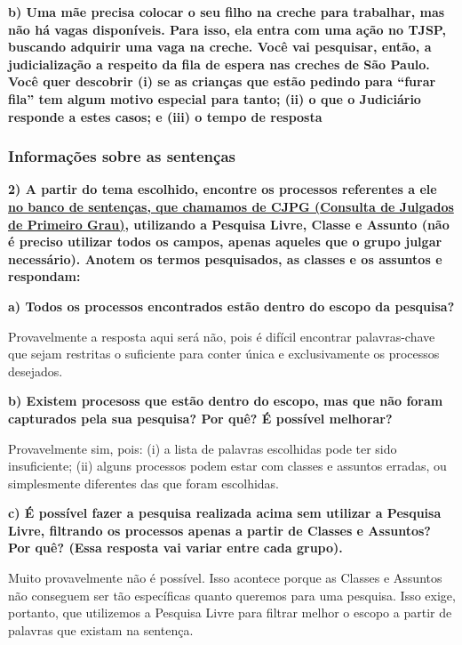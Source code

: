 \documentclass[
  letterpaper,
  DIV=11,
  numbers=noendperiod]{scrartcl}
\begin{document}
\textbf{b) Uma mãe precisa colocar o seu filho na creche para trabalhar,
mas não há vagas disponíveis. Para isso, ela entra com uma ação no TJSP,
buscando adquirir uma vaga na creche. Você vai pesquisar, então, a
judicialização a respeito da fila de espera nas creches de São Paulo.
Você quer descobrir (i) se as crianças que estão pedindo para ``furar
fila'' tem algum motivo especial para tanto; (ii) o que o Judiciário
responde a estes casos; e (iii) o tempo de resposta}

\hypertarget{informauxe7uxf5es-sobre-as-sentenuxe7as}{%
\subsubsection{Informações sobre as
sentenças}\label{informauxe7uxf5es-sobre-as-sentenuxe7as}}

\textbf{2) A partir do tema escolhido, encontre os processos referentes
a ele \href{https://esaj.tjsp.jus.br/cjpg/}{no banco de sentenças, que
chamamos de CJPG (Consulta de Julgados de Primeiro Grau)}, utilizando a
Pesquisa Livre, Classe e Assunto (não é preciso utilizar todos os
campos, apenas aqueles que o grupo julgar necessário). Anotem os termos
pesquisados, as classes e os assuntos e respondam:}

\textbf{a) Todos os processos encontrados estão dentro do escopo da
pesquisa?}

Provavelmente a resposta aqui será não, pois é difícil encontrar
palavras-chave que sejam restritas o suficiente para conter única e
exclusivamente os processos desejados.

\textbf{b) Existem procesoss que estão dentro do escopo, mas que não
foram capturados pela sua pesquisa? Por quê? É possível melhorar?}

Provavelmente sim, pois: (i) a lista de palavras escolhidas pode ter
sido insuficiente; (ii) alguns processos podem estar com classes e
assuntos erradas, ou simplesmente diferentes das que foram escolhidas.

\textbf{c) É possível fazer a pesquisa realizada acima sem utilizar a
Pesquisa Livre, filtrando os processos apenas a partir de Classes e
Assuntos? Por quê? (Essa resposta vai variar entre cada grupo).}

Muito provavelmente não é possível. Isso acontece porque as Classes e
Assuntos não conseguem ser tão específicas quanto queremos para uma
pesquisa. Isso exige, portanto, que utilizemos a Pesquisa Livre para
filtrar melhor o escopo a partir de palavras que existam na sentença.
\end{document}
